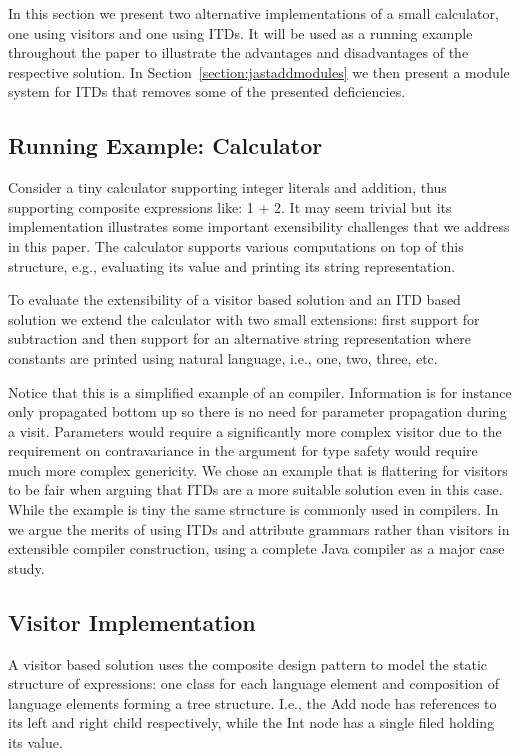 In this section we present two alternative implementations of a small
calculator, one using visitors and one using ITDs. It will be used as a
running example throughout the paper to illustrate the advantages and
disadvantages of the respective solution. In Section~\ref{section:jastaddmodules}
we then present a module system for ITDs that removes some of the presented
deficiencies.

\subsection{Running Example: Calculator}
Consider a tiny calculator supporting integer literals and addition, thus 
supporting composite expressions like: 1 + 2. It may seem trivial but its 
implementation illustrates some important exensibility challenges that we 
address in this paper. The calculator supports various computations on top 
of this structure, e.g., evaluating its value and printing its string
representation.

To evaluate the extensibility of a visitor based solution and an ITD based
solution we extend the calculator with two small extensions: first support
for subtraction and then support for an alternative string representation 
where constants are printed using natural language, i.e., one, two, 
three, etc.


Notice that this is a simplified example of an compiler. Information is
for instance only propagated bottom up so there is no need for parameter
propagation during a visit. Parameters would require a significantly more 
complex visitor due to the requirement on contravariance in the argument 
for type safety would require much more complex genericity. We chose an 
example that is flattering for visitors to be fair when arguing that ITDs 
are a more suitable solution even in this case. While the example is 
tiny the same structure is commonly used in compilers. In~\cite{aosd08abc} we argue 
the merits of using ITDs and attribute grammars rather than visitors in 
extensible compiler construction, using a complete Java compiler as a 
major case study.

\subsection{Visitor Implementation}
A visitor based solution uses the composite design pattern to model the
static structure of expressions: one class for each language element and
composition of language elements forming a tree structure. I.e., the 
Add node has references to its left and right child respectively, while 
the Int node has a single filed holding its value.

